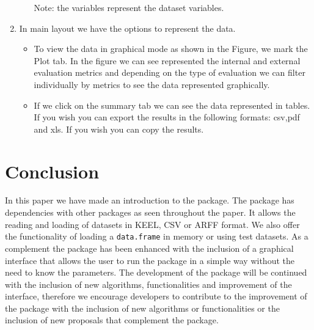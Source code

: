 \begin{enumerate}
\begin{itemize}
Note: the variables represent the dataset variables.
\end{itemize}
  \item In main layout we have the options to represent the data.
  \begin{itemize}
  \item To view the data in graphical mode as shown in the Figure, we mark the Plot tab. In the figure we can see represented the internal and external evaluation metrics and depending on the type of evaluation we can filter individually by metrics to see the data represented graphically.
  \item If we click on the summary tab we can see the data represented in tables. If you wish you can export the results in the following formats: csv,pdf and xls. If you wish you can copy the results.
\end{itemize}


\end{enumerate}

\section{Conclusion}

In this paper we have made an introduction to the  package. The package has dependencies with other packages as seen throughout the paper. It allows the reading and loading of datasets in KEEL, CSV or ARFF format. We also offer the functionality of loading a \texttt{data.frame} in memory or using test datasets. As a complement the package has been enhanced with the inclusion of a graphical interface that allows the user to run the package in a simple way without the need to know the parameters. The development of the package will be continued with the inclusion of new algorithms, functionalities and improvement of the interface, therefore we encourage developers to contribute to the improvement of the package with the inclusion of new algorithms or functionalities or the inclusion of new proposals that complement the package.



\address{Luis Alfonso Pérez Martos\\
  Computer Department\\
  University of Jaén\\
  Spain\\
  (ORCiD if desired)\\
  }

